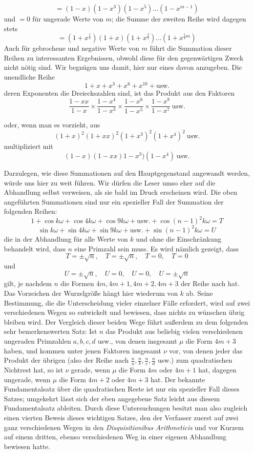 \[
=(1-x)(1-x^3)(1-x^5)\ldots(1-x^{m-1})
\]
und $=0$ für ungerade Werte von $m$; die Summe der zweiten Reihe wird dagegen stets
\[
=(1+x^{\frac12})(1+x)(1+x^{\frac32})\ldots(1+x^{\frac12m})
\]
Auch für gebrochene und negative Werte von $m$ führt die Summation dieser Reihen zu interessanten Ergebnissen, obwohl diese für den gegenwärtigen Zweck nicht nötig sind. Wir begnügen uns damit, hier nur eines davon anzugeben. Die unendliche Reihe
\[
1+x+x^3+x^6+x^{10}+\text{usw.}
\]
deren Exponenten die Dreieckszahlen sind, ist das Produkt aus den Faktoren
\[
\frac{1-xx}{1-x}\times\frac{1-x^4}{1-x^3}\times\frac{1-x^6}{1-x^5}\times\frac{1-x^8}{1-x^7}\ \text{usw.}
\]
\begin{samepage}
oder, wenn man es vorzieht, aus
\[
(1+x)^2(1+xx)^2(1+x^3)^2(1+x^4)^2\ \text{usw.}
\]
multipliziert mit
\[
(1-x)(1-xx)1-x^3)(1-x^4)\ \text{usw.}
\]
\end{samepage}

Darzulegen, wie diese Summationen auf den Hauptgegenstand angewandt werden, würde uns hier zu weit führen. Wir dürfen die Leser umso eher auf die Abhandlung selbst verweisen, als sie bald im Druck erscheinen wird. Die oben angeführten Summationen sind nur ein spezieller Fall der Summation der folgenden Reihen:
\[
1+\cos k\omega+\cos4k\omega+\cos9k\omega+\text{usw.}+\cos(n-1)^2k\omega=T
\]
\[
\sin k\omega+\sin4k\omega+\sin9k\omega+\text{usw.}+\sin(n-1)^2k\omega=U
\]
die in der Abhandlung für alle Werte von $k$ und ohne die Einschränkung
%
behandelt wird, dass $n$ eine Primzahl sein muss. Es wird nämlich gezeigt, dass
\[
T=\pm\surd n,\quad T=\pm\surd n,\quad T=0,\quad T=0
\]
und
\[
U=\pm\surd n,\quad U=0,\quad U=0,\quad U=\pm\surd n
\]
gilt, je nachdem $n$ die Formen $4m,4m+1,4m+2,4m+3$ der Reihe nach hat. Das Vorzeichen der Wurzelgröße hängt hier wiederum von $k$ ab. Seine Bestimmung, die die Unterscheidung vieler einzelner Fälle erfordert, wird auf zwei verschiedenen Wegen so entwickelt und bewiesen, dass nichts zu wünschen übrig bleiben wird. Der Vergleich dieser beiden Wege führt außerdem zu dem folgenden sehr bemerkenswerten Satz: Ist $n$ das Produkt aus beliebig vielen verschiedenen ungeraden Primzahlen $a,b,c,d$ usw., von denen insgesamt $\mu$ die Form $4m+3$ haben, und kommen unter jenen Faktoren insgesamt $\nu$ vor, von denen jeder das Produkt der übrigen (also der Reihe nach $\frac na,\frac nb,\frac nc,\frac nd$ usw.) zum quadratischen Nichtrest hat, so ist $\nu$ gerade, wenn $\mu$ die Form $4m$ oder $4m+1$ hat, dagegen ungerade, wenn $\mu$ die Form $4m+2$ oder $4m+3$ hat. Der bekannte Fundamentalsatz über die quadratischen Reste ist nur ein spezieller Fall dieses Satzes; umgekehrt lässt sich der eben angegebene Satz leicht aus diesem Fundamentalsatz ableiten. Durch diese Untersuchungen besitzt man also zugleich einen vierten Beweis dieses wichtigen Satzes, den der Verfasser zuerst auf zwei ganz verschiedenen Wegen in den \emph{Disquisitionibus Arithmeticis} und vor Kurzem auf einem dritten, ebenso verschiedenen Weg in einer eigenen Abhandlung bewiesen hatte.
